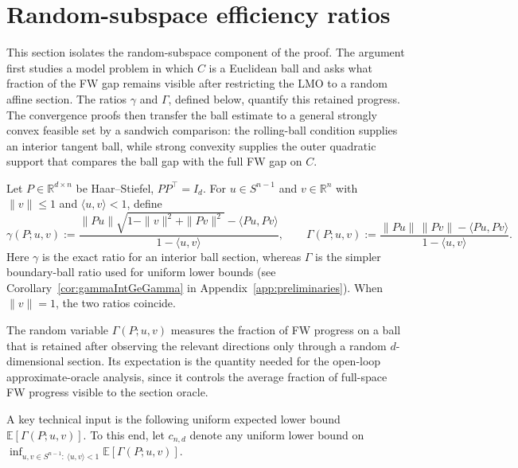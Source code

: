 \documentclass{article}
\begin{document}
\section{Random-subspace efficiency ratios}
\label{sec:efficiency_ratios}

This section isolates the random-subspace component of the proof. The argument
first studies a model problem in which \(C\) is a Euclidean ball and asks what
fraction of the FW gap remains visible after restricting the LMO to a random
affine section. The ratios \(\gamma\) and \(\Gamma\), defined below, quantify
this retained progress. The convergence proofs then transfer the ball estimate
to a general strongly convex feasible set by a sandwich comparison: the
rolling-ball condition supplies an interior tangent ball, while strong
convexity supplies the outer quadratic support that compares the ball gap with
the full FW gap on \(C\).

Let \(P\in\mathbb R^{d\times n}\) be Haar--Stiefel, \(PP^\top=I_d\). For
\(u\in S^{n-1}\) and \(v\in\mathbb R^n\) with \(\|v\|\le1\) and
\(\langle u,v\rangle<1\), define
\[
\gamma(P;u,v):=
\frac{\|Pu\|\sqrt{1-\|v\|^2+\|Pv\|^2}-\langle Pu,Pv\rangle}
{1-\langle u,v\rangle},
\qquad
\Gamma(P;u,v):=
\frac{\|Pu\|\,\|Pv\|-\langle Pu,Pv\rangle}
{1-\langle u,v\rangle}.
\]
Here \(\gamma\) is the exact ratio for an interior ball section, whereas
\(\Gamma\) is the simpler boundary-ball ratio used for uniform lower bounds (see
Corollary~\ref{cor:gammaIntGeGamma} in Appendix~\ref{app:preliminaries}). When \(\|v\|=1\), the two ratios coincide.

The random variable \(\Gamma(P;u,v)\) measures the fraction of FW progress on a
ball that is retained after observing the relevant directions only through a
random \(d\)-dimensional section. Its expectation is the quantity needed for the
open-loop approximate-oracle analysis, since it controls the average fraction
of full-space FW progress visible to the section oracle.

A key technical input is the following uniform expected lower bound $\mathbb{E}[\Gamma(P;u,v)]$. To this end, let \(c_{n,d}\) denote any uniform lower bound on
$\inf_{u,v\in S^{n-1}:\ \langle u,v\rangle <1}
\mathbb E[\Gamma(P;u,v)].$
\end{document}
